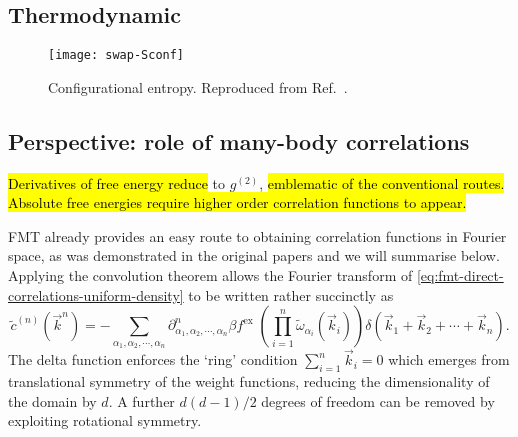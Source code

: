 \subsection{Thermodynamic}

\begin{SCfigure}
  \texttt{[image: swap-Sconf]}
  \caption[Configurational entropy in hard spheres from Monte-Carlo simulations]{
    Configurational entropy.
    Reproduced from Ref.\ \cite{BerthierPNAS2017}.
  }
\end{SCfigure}

\subsection{Perspective: role of many-body correlations}

\hl{Derivatives of free energy reduce} to $g^{(2)}$,\hl{ emblematic of the conventional routes.
Absolute free energies require higher order correlation functions to appear.}

FMT already provides an easy route to obtaining correlation functions in Fourier space, as was demonstrated in the original papers \cite{RosenfeldPRL1989,RosenfeldJCP1990} and we will summarise below.
Applying the convolution theorem allows the Fourier transform of \eqref{eq:fmt-direct-correlations-uniform-density} to be written rather succinctly as
\begin{equation}
  \tilde{c}^{(n)}(\vec{k}^n)
  =
  - \sum_{\alpha_1, \alpha_2, \cdots, \alpha_n}
  \partial^n_{\alpha_1, \alpha_2, \cdots, \alpha_n} \beta f^\mathrm{ex} \;
  \left( \prod_{i=1}^n \widetilde{\omega}_{\alpha_i}(\vec{k}_i) \right)
  \delta(\vec{k}_1 + \vec{k}_2 + \cdots + \vec{k}_n).
\end{equation}
The delta function enforces the `ring' condition $\sum_{i=1}^n \vec{k}_i = 0$ which emerges from translational symmetry of the weight functions, reducing the dimensionality of the domain by $d$.
A further $d(d-1)/2$ degrees of freedom%
can be removed by exploiting rotational symmetry.
